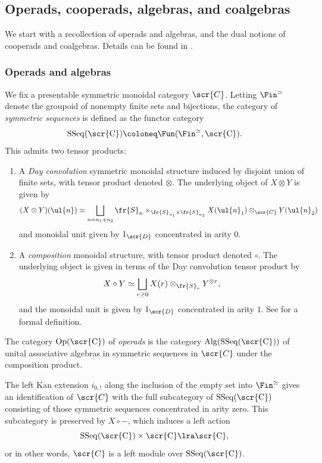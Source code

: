 \documentclass[a4paper]{amsart}
\begin{document}
\subsection{Operads, cooperads, algebras, and coalgebras}

We start with a recollection of operads and algebras, and the dual notions of cooperads and coalgebras. Details can be found in \cite{BCN,Wu,HeineMM,HeutsKoszul}. 

\subsubsection{Operads and algebras}\label{sec:operads-algebras} We fix a presentable symmetric monoidal category $\scr{C}$. Letting $\Fin^\simeq$ denote the groupoid of nonempty finite sets and bijections, the category of \emph{symmetric sequences} is defined as the functor category
\[\rm{SSeq}(\scr{C}) \coloneq \Fun(\Fin^\simeq,\scr{C}).\]
This admits two tensor products:
\begin{enumerate} 
\item A \emph{Day convolution} symmetric monoidal structure induced by disjoint union of finite sets, with tensor product denoted $\otimes$. The underlying object of $X \otimes Y$ is given by 
\[(X \otimes Y)(\ul{n}) \simeq \bigsqcup_{n = n_1+n_2} \fr{S}_{n} \times_{\fr{S}_{n_1} \times \fr{S}_{n_2}} X(\ul{n}_1) \otimes_\scr{C} Y(\ul{n}_2)\]
and monoidal unit given by $1_\scr{D}$ concentrated in arity $0$.
\item A \emph{composition} monoidal structure, with tensor product denoted $\circ$. The underlying object is given in terms of the Day convolution tensor product by
	\[X \circ Y \simeq \bigsqcup_{r \geq 0} X(r) \otimes_{\fr{S}_r} Y^{\otimes r},\]
and the monoidal unit is given by $1_\scr{D}$ concentrated in arity $1$. See \cite[p.~45]{Wu} for a formal definition. 
\end{enumerate}

\begin{definition}The category $\rm{Op}(\scr{C})$ of \emph{operads} is the category $\rm{Alg}(\rm{SSeq}(\scr{C}))$ of unital associative algebras in symmetric sequences in $\scr{C}$ under the composition product.
\end{definition}

The left Kan extension $i_{0,!}$ along the inclusion of the empty set into $\Fin^\simeq$ gives an identification of $\scr{C}$ with the full subcategory of $\rm{SSeq}(\scr{C})$ consisting of those symmetric sequences concentrated in arity zero. This subcategory is preserved by $X \circ -$, which induces a left action 
\[\rm{SSeq}(\scr{C}) \times \scr{C} \lra \scr{C},\]
or in other words, $\scr{C}$ is a left module over $\rm{SSeq}(\scr{C})$.
\end{document}
